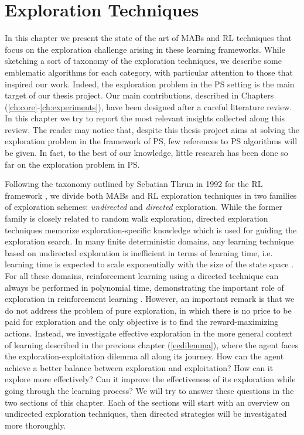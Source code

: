 
\chapter{Exploration Techniques} \label{ch:sota}

In this chapter we present the state of the art of \gls{MAB}s and \gls{RL} techniques that focus on the exploration challenge arising in these learning frameworks. While sketching a sort of taxonomy of the exploration techniques, we describe some emblematic algorithms for each category, with particular attention to those that inspired our work. Indeed, the exploration problem in the \gls{PS} setting is the main target of our thesis project. Our main contributions, described in Chapters (\ref{ch:core}-\ref{ch:experiments}), have been designed after a careful literature review. In this chapter we try to report the most relevant insights collected along this review. The reader may notice that, despite this thesis project aims at solving the exploration problem in the framework of \gls{PS}, few references to \gls{PS} algorithms will be given. In fact, to the best of our knowledge, little research has been done so far on the exploration problem in \gls{PS}.

Following the taxonomy outlined by Sebatian Thrun in 1992 for the \gls{RL} framework  \cite{thrun1992efficient}, we divide both \gls{MAB}s and \gls{RL} exploration techniques in two families of exploration schemes: \emph{undirected} and \emph{directed} exploration.
While the former family is closely related to random walk exploration, directed exploration techniques memorize exploration-specific knowledge which is used for guiding the exploration search. In many finite deterministic domains, any learning technique based on undirected exploration is inefficient in terms of learning time, i.e. learning time is expected to scale exponentially with the size of the state space \cite{whitehead1991study}. For all these domains, reinforcement learning using a directed technique can always be performed in polynomial time, demonstrating the important role of exploration in reinforcement learning \cite{thrun1992efficient}. However, an important remark is that we do not address the problem of pure exploration, in which there is no price to be paid for exploration and the only objective is to find the reward-maximizing actions. Instead, we investigate effective exploration in the more general context of learning described in the previous chapter (\ref{eedilemma}), where the agent faces the exploration-exploitation dilemma all along its journey. How can the agent achieve a better balance between exploration and exploitation? How can it explore more effectively? Can it improve the effectiveness of its exploration while going through the learning process? We will try to answer these questions in the two sections of this chapter. Each of the sections will start with an overview on undirected exploration techniques, then directed strategies will be investigated more thoroughly. 


